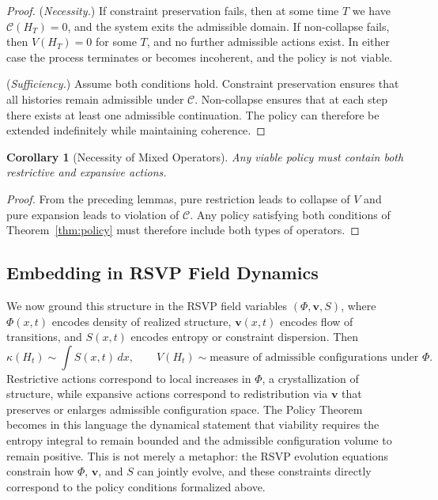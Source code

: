 \documentclass[12pt, a4paper]{article}
\theoremstyle{plain}
\newtheorem{corollary}[theorem]{Corollary}
\theoremstyle{definition}
\theoremstyle{remark}
\begin{document}
\begin{proof}
(\textit{Necessity.}) If constraint preservation fails, then at some time $T$ we have $\mathcal{C}(H_T) = 0$, and the system exits the admissible domain. If non-collapse fails, then $V(H_T) = 0$ for some $T$, and no further admissible actions exist. In either case the process terminates or becomes incoherent, and the policy is not viable.

(\textit{Sufficiency.}) Assume both conditions hold. Constraint preservation ensures that all histories remain admissible under $\mathcal{C}$. Non-collapse ensures that at each step there exists at least one admissible continuation. The policy can therefore be extended indefinitely while maintaining coherence.
\end{proof}

\begin{corollary}[Necessity of Mixed Operators]
Any viable policy must contain both restrictive and expansive actions.
\end{corollary}

\begin{proof}
From the preceding lemmas, pure restriction leads to collapse of $V$ and pure expansion leads to violation of $\mathcal{C}$. Any policy satisfying both conditions of Theorem~\ref{thm:policy} must therefore include both types of operators.
\end{proof}

\subsection{Embedding in RSVP Field Dynamics}

We now ground this structure in the RSVP field variables $(\Phi, \mathbf{v}, S)$, where $\Phi(x,t)$ encodes density of realized structure, $\mathbf{v}(x,t)$ encodes flow of transitions, and $S(x,t)$ encodes entropy or constraint dispersion. Then
\[
\kappa(H_t) \sim \int S(x,t)\,dx, \qquad V(H_t) \sim \text{measure of admissible configurations under } \Phi.
\]
Restrictive actions correspond to local increases in $\Phi$, a crystallization of structure, while expansive actions correspond to redistribution via $\mathbf{v}$ that preserves or enlarges admissible configuration space. The Policy Theorem becomes in this language the dynamical statement that viability requires the entropy integral to remain bounded and the admissible configuration volume to remain positive. This is not merely a metaphor: the RSVP evolution equations constrain how $\Phi$, $\mathbf{v}$, and $S$ can jointly evolve, and these constraints directly correspond to the policy conditions formalized above.
\end{document}
